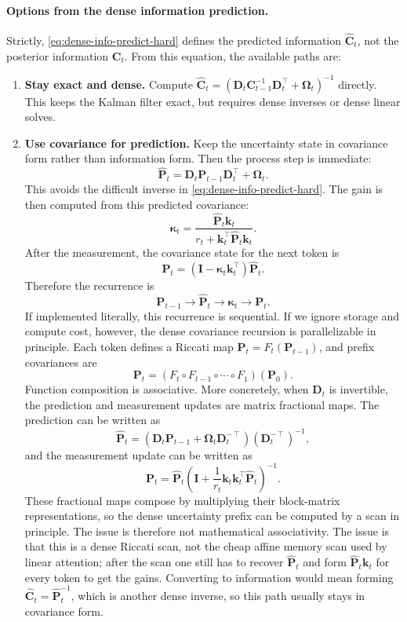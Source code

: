 \documentclass[11pt]{article}
\newcommand{\ve}[1]{\boldsymbol{#1}}
\newcommand{\tr}{\intercal}
\begin{document}
\paragraph{Options from the dense information prediction.}
Strictly, \eqref{eq:dense-info-predict-hard} defines the predicted information
$\widehat{\ve{C}}_t$, not the posterior information $\ve{C}_t$. From this equation, the
available paths are:
\begin{enumerate}[leftmargin=1.6em,itemsep=3pt]
  \item \textbf{Stay exact and dense.} Compute
  $\widehat{\ve{C}}_t=(\ve{D}_t\ve{C}_{t-1}^{-1}\ve{D}_t^{\tr}+\ve{\Omega}_t)^{-1}$ directly.
  This keeps the Kalman filter exact, but requires dense inverses or dense linear solves.

  \item \textbf{Use covariance for prediction.} Keep the uncertainty state in covariance form
  rather than information form. Then the process step is immediate:
  \[
    \widehat{\ve{P}}_t
    =
    \ve{D}_t\ve{P}_{t-1}\ve{D}_t^{\tr}+\ve{\Omega}_t .
  \]
  This avoids the difficult inverse in \eqref{eq:dense-info-predict-hard}. The gain is then
  computed from this predicted covariance:
  \[
    \ve{\kappa}_t
    =
    \frac{\widehat{\ve{P}}_t\ve{k}_t}
    {r_t+\ve{k}_t^{\tr}\widehat{\ve{P}}_t\ve{k}_t}.
  \]
  After the measurement, the covariance state for the next token is
  \[
    \ve{P}_t
    =
    (\ve{I}-\ve{\kappa}_t\ve{k}_t^{\tr})\widehat{\ve{P}}_t.
  \]
  Therefore the recurrence is
  \[
    \ve{P}_{t-1}
    \longrightarrow
    \widehat{\ve{P}}_t
    \longrightarrow
    \ve{\kappa}_t
    \longrightarrow
    \ve{P}_t .
  \]
  If implemented literally, this recurrence is sequential. If we ignore storage and compute
  cost, however, the dense covariance recursion is parallelizable in principle. Each token
  defines a Riccati map $\ve{P}_t=F_t(\ve{P}_{t-1})$, and prefix covariances are
  \[
    \ve{P}_t=(F_t\circ F_{t-1}\circ\cdots\circ F_1)(\ve{P}_0).
  \]
  Function composition is associative. More concretely, when $\ve{D}_t$ is invertible, the
  prediction and measurement updates are matrix fractional maps. The prediction can be
  written as
  \[
    \widehat{\ve{P}}_t
    =
    (\ve{D}_t\ve{P}_{t-1}+\ve{\Omega}_t\ve{D}_t^{-\tr})
    (\ve{D}_t^{-\tr})^{-1},
  \]
  and the measurement update can be written as
  \[
    \ve{P}_t
    =
    \widehat{\ve{P}}_t
    \left(\ve{I}+\frac{1}{r_t}\ve{k}_t\ve{k}_t^{\tr}\widehat{\ve{P}}_t\right)^{-1}.
  \]
  These fractional maps compose by multiplying their block-matrix representations, so the
  dense uncertainty prefix can be computed by a scan in principle. The issue is therefore not
  mathematical associativity. The issue is that this is a dense Riccati scan, not the cheap
  affine memory scan used by linear attention; after the scan one still has to recover
  $\widehat{\ve{P}}_t$ and form $\widehat{\ve{P}}_t\ve{k}_t$ for every token to get the gains.
  Converting to information would mean forming
  $\widehat{\ve{C}}_t=\widehat{\ve{P}}_t^{-1}$, which is another dense inverse, so this path
  usually stays in covariance form.


\end{enumerate}
\end{document}
